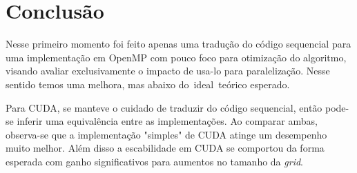 \section{Conclusão}

Nesse primeiro momento foi feito apenas uma tradução do código sequencial para uma implementação em OpenMP com pouco foco para otimização do algoritmo, visando avaliar exclusivamente o impacto de usa-lo para paralelização. Nesse sentido temos uma melhora, mas abaixo do ideal teórico esperado.

Para CUDA, se manteve o cuidado de traduzir do código sequencial, então pode-se inferir uma equivalência entre as implementações. Ao comparar ambas, observa-se que a implementação "simples" de CUDA atinge um desempenho muito melhor. Além disso a escabilidade em CUDA se comportou da forma esperada com ganho significativos para aumentos no tamanho da \textit{grid}.
